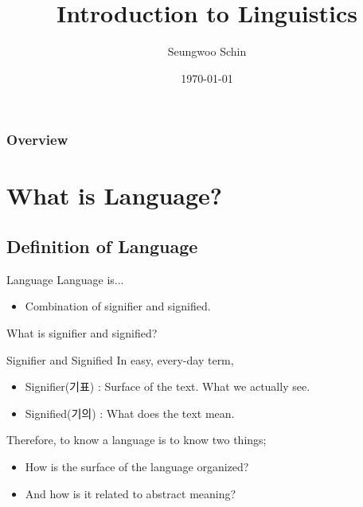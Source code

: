 \documentclass{beamer}
\title[NLP101]{Introduction to Linguistics} %
\author{Seungwoo Schin} %
\institute[NCSOFT] %
{
NCSOFT \\ %
\medskip
\textit{principia12@ncsoft.com} %
}
\date{\today} %
\begin{document}
\begin{frame}
\titlepage %
\end{frame}

\begin{frame}
\frametitle{Overview} %
\tableofcontents %
\end{frame}


\section{What is Language?}

\subsection{Definition of Language}

\begin{frame}{Language}
Language is...
\begin{itemize}
\item Combination of signifier and signified. \cite{saus}
\end{itemize}

What is signifier and signified?
\end{frame}

\begin{frame}{Signifier and Signified}
In easy, every-day term,

\begin{itemize}
\item Signifier(기표) : Surface of the text. What we actually see.
\item Signified(기의) : What does the text mean.
\end{itemize}


Therefore, to know a language is to know two things;

\begin{itemize}
\item How is the surface of the language organized?
\item And how is it related to abstract meaning?
\end{itemize}

\end{frame}
\end{document}
